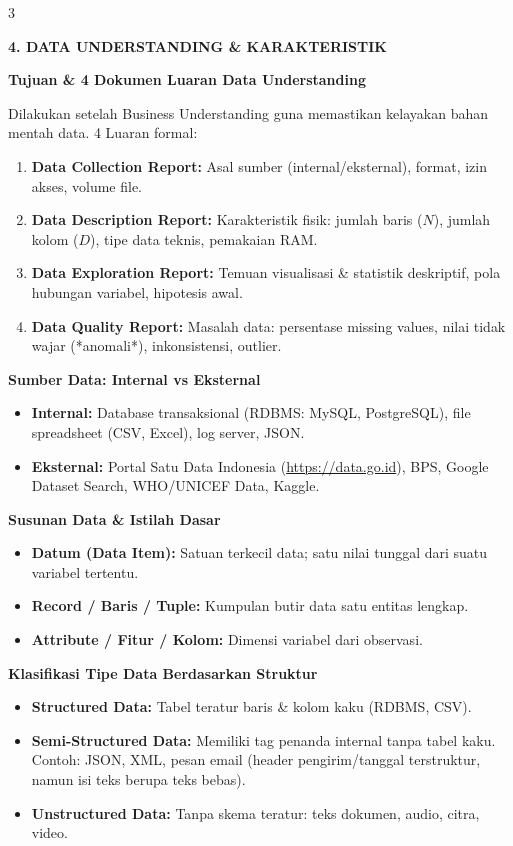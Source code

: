 \documentclass[6.8pt,landscape,a4paper]{extarticle}
\newcommand{\sdtSection}[2][sdtNavy]{%
    \vspace{0.6pt}%
    \noindent\colorbox{#1}{%
        \parbox{\dimexpr\linewidth-2\fboxsep\relax}{%
            \textbf{\fontsize{6.5pt}{7.5pt}\selectfont\color{white}#2}%
        }%
    }\vspace{0.3pt}%
}
\newcommand{\sdtSub}[1]{%
    \vspace{0.5pt}%
    \noindent\textbf{\fontsize{5.8pt}{6.8pt}\selectfont\color{sdtBlue}#1}\vspace{0.1pt}%
}
\begin{document}
\begin{multicols}{3}

\sdtSection{4. DATA UNDERSTANDING \& KARAKTERISTIK}

\sdtSub{Tujuan \& 4 Dokumen Luaran Data Understanding}
Dilakukan setelah Business Understanding guna memastikan kelayakan bahan mentah data. 4 Luaran formal:
\begin{enumerate}
    \item \textbf{Data Collection Report:} Asal sumber (internal/eksternal), format, izin akses, volume file.
    \item \textbf{Data Description Report:} Karakteristik fisik: jumlah baris ($N$), jumlah kolom ($D$), tipe data teknis, pemakaian RAM.
    \item \textbf{Data Exploration Report:} Temuan visualisasi \& statistik deskriptif, pola hubungan variabel, hipotesis awal.
    \item \textbf{Data Quality Report:} Masalah data: persentase missing values, nilai tidak wajar (*anomali*), inkonsistensi, outlier.
\end{enumerate}

\sdtSub{Sumber Data: Internal vs Eksternal}
\begin{itemize}
    \item \textbf{Internal:} Database transaksional (RDBMS: MySQL, PostgreSQL), file spreadsheet (CSV, Excel), log server, JSON.
    \item \textbf{Eksternal:} Portal Satu Data Indonesia (\url{https://data.go.id}), BPS, Google Dataset Search, WHO/UNICEF Data, Kaggle.
\end{itemize}

\sdtSub{Susunan Data \& Istilah Dasar}
\begin{itemize}
    \item \textbf{Datum (Data Item):} Satuan terkecil data; satu nilai tunggal dari suatu variabel tertentu.
    \item \textbf{Record / Baris / Tuple:} Kumpulan butir data satu entitas lengkap.
    \item \textbf{Attribute / Fitur / Kolom:} Dimensi variabel dari observasi.
\end{itemize}

\sdtSub{Klasifikasi Tipe Data Berdasarkan Struktur}
\begin{itemize}
    \item \textbf{Structured Data:} Tabel teratur baris \& kolom kaku (RDBMS, CSV).
    \item \textbf{Semi-Structured Data:} Memiliki tag penanda internal tanpa tabel kaku. Contoh: JSON, XML, pesan email (header pengirim/tanggal terstruktur, namun isi teks berupa teks bebas).
    \item \textbf{Unstructured Data:} Tanpa skema teratur: teks dokumen, audio, citra, video.
\end{itemize}


\end{multicols}
\end{document}
